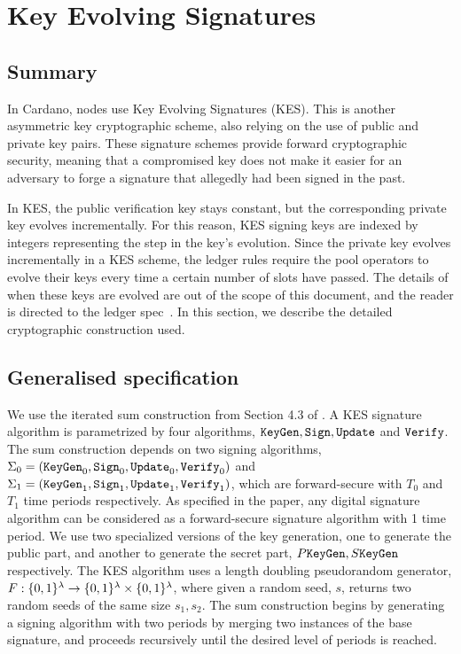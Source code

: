 \section{Key Evolving Signatures}
\label{sec:kes}

\subsection{Summary}
In Cardano, nodes use Key Evolving Signatures (KES).
This is another asymmetric key cryptographic scheme, also relying on
the use of public and private key pairs.
These signature schemes provide forward cryptographic security, meaning that a
compromised key does not make it easier for an adversary to forge a signature that
allegedly had been signed in the past.

In KES, the public verification key stays constant, but the
corresponding private key evolves incrementally. For this reason, KES
signing keys are indexed by integers representing the step in the key's
evolution. Since the private key evolves incrementally in a KES scheme, the ledger rules
require the pool operators to evolve their keys every time a certain number of
slots have passed. The details of when these keys are evolved are out of the
scope of this document, and the reader is directed to the ledger spec~\cite{ledgerspec}.
In this section, we describe the detailed cryptographic construction used.

\subsection{Generalised specification}
We use the iterated sum construction from Section 4.3 of \cite{cryptoeprint:2001:034}.
A KES signature algorithm is parametrized by four algorithms, $\texttt{KeyGen}, \texttt{Sign}, \texttt{Update}$ and $\texttt{Verify}$. The sum
construction depends on two signing algorithms, $\Sigma_0 = (\texttt{KeyGen}_0, \texttt{Sign}_0, \allowbreak\texttt{Update}_0, \texttt{Verify}_0)$
and $\Sigma_1 = (\texttt{KeyGen}_1, \texttt{Sign}_1, \texttt{Update}_1, \texttt{Verify}_1)$, which are forward-secure with $T_0$ and $T_1$ time
periods respectively. As specified in the paper, any digital signature algorithm can be considered as a
forward-secure signature algorithm with 1 time period.
We use two specialized versions of the key generation, one to generate the public
part, and another to generate the secret part, $P\texttt{KeyGen}, S\texttt{KeyGen}$ respectively. The KES algorithm
uses a length doubling pseudorandom generator, $F:\{0,1\}^{\lambda}\rightarrow\{0,1\}^{\lambda}\times\{0,
1\}^{\lambda}$, where given a random seed, $s$, returns two random seeds of the same size $s_1, s_2$. The sum
construction begins by generating a signing algorithm with two periods by merging two instances of the base signature,
and proceeds recursively until the desired level of periods is reached.

